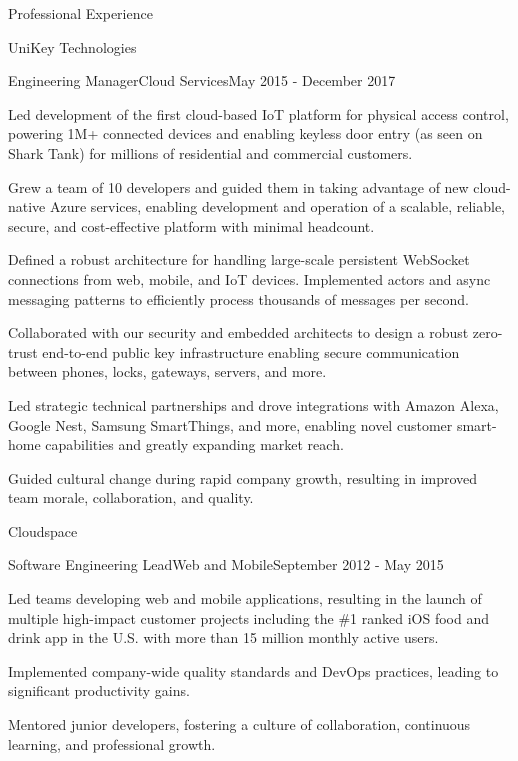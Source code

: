 \documentclass{resume} %
\begin{document}
\begin{rSection}{Professional Experience}
  \begin{rCompany}{UniKey Technologies}{}{}

    \begin{rSubSubsection}{Engineering Manager}{Cloud Services}{May 2015 - December 2017}
      \item Led development of the first cloud-based IoT platform for physical access control, powering 1M+ connected devices and enabling keyless door entry (as seen on Shark Tank) for millions of residential and commercial customers.
      \item Grew a team of 10 developers and guided them in taking advantage of new cloud-native Azure services, enabling development and operation of a scalable, reliable, secure, and cost-effective platform with minimal headcount.
      \item Defined a robust architecture for handling large-scale persistent WebSocket connections from web, mobile, and IoT devices. Implemented actors and async messaging patterns to efficiently process thousands of messages per second.
      \item Collaborated with our security and embedded architects to design a robust zero-trust end-to-end public key infrastructure enabling secure communication between phones, locks, gateways, servers, and more.
      \item Led strategic technical partnerships and drove integrations with Amazon Alexa, Google Nest, Samsung SmartThings, and more, enabling novel customer smart-home capabilities and greatly expanding market reach.
      \item Guided cultural change during rapid company growth, resulting in improved team morale, collaboration, and quality.
    \end{rSubSubsection}
  \end{rCompany}

  \begin{rCompany}{Cloudspace}{}{}

    \begin{rSubSubsection}{Software Engineering Lead}{Web and Mobile}{September 2012 - May 2015}
      \item Led teams developing web and mobile applications, resulting in the launch of multiple high-impact customer projects including the \#1 ranked iOS food and drink app in the U.S. with more than 15 million monthly active users.
      \item Implemented company-wide quality standards and DevOps practices, leading to significant productivity gains.
      \item Mentored junior developers, fostering a culture of collaboration, continuous learning, and professional growth.
    \end{rSubSubsection}
  \end{rCompany}


\end{rSection}
\end{document}
